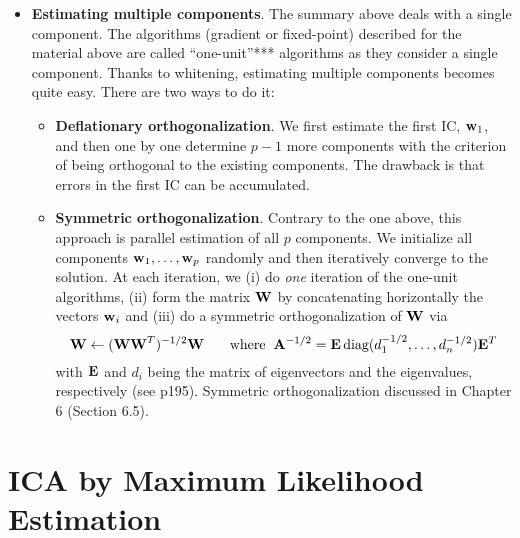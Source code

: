 \documentclass[a4paper, one	side]{book}
\begin{document}
\begin{itemize}
\item \textbf{Estimating multiple components}. The summary above deals with a single component. The algorithms (gradient or fixed-point) described for the material above are called ``one-unit''*** algorithms as they consider a single component. Thanks to whitening, estimating multiple components becomes quite easy. There are two ways to do it:
	\begin{itemize}
	\item \textbf{Deflationary orthogonalization}. We first estimate the first IC, $\mathbf w_1$, and then one by one determine $p-1$ more components with the criterion of being orthogonal to the existing components. The drawback is that errors in the first IC can be accumulated.
	\item \textbf{Symmetric orthogonalization}. Contrary to the one above, this approach is parallel estimation of all $p$ components. We initialize all components $\mathbf{w}_1,\hdots, \mathbf{w}_p$ randomly and then iteratively converge to the solution. At each iteration, we (i) do \textit{one} iteration of the one-unit algorithms, (ii) form the matrix $\mathbf W$ by concatenating horizontally the vectors $\mathbf w_i$ and (iii) do a symmetric orthogonalization of $\mathbf W$ via $$\mathbf{W} \gets (\mathbf{WW}^T)^{-1/2}\mathbf W\hspace{0.65cm}\text{where}\hspace{0.2cm} \mathbf{A}^{-1/2} = \mathbf E\, \text{diag}(d_1^{-1/2},\hdots,d_n^{-1/2}) \mathbf E^T$$ with $\mathbf E$ and $d_i$ being the matrix of eigenvectors and the eigenvalues, respectively  (see p195). Symmetric orthogonalization discussed in Chapter 6 (Section 6.5). 
	\end{itemize}
	
	
\end{itemize}













\chapter{ICA by Maximum Likelihood Estimation}
\end{document}
